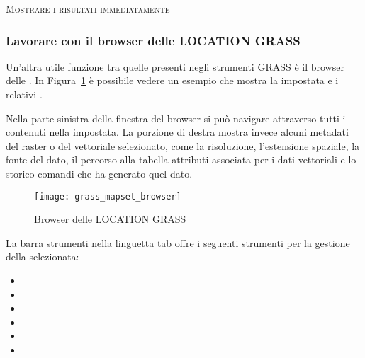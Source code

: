\begin{Tip}\caption{\textsc{Mostrare i risultati immediatamente}}
\end{Tip} 

\subsubsection{Lavorare con il browser delle LOCATION GRASS} 

Un'altra utile funzione tra quelle presenti negli strumenti GRASS è il browser
delle . In Figura~\ref{fig:grass_mapset_browser} è
possibile vedere un esempio che mostra la  impostata 
e i relativi .

Nella parte sinistra della finestra del browser si può navigare attraverso
tutti i  contenuti nella  impostata. La
porzione di destra mostra invece alcuni metadati del raster o del vettoriale
selezionato, come la risoluzione, l'estensione spaziale, la fonte del dato, il
percorso alla tabella attributi associata per i dati vettoriali e lo storico
comandi che ha generato quel dato.

\begin{figure}[h]
 \begin{center}
 \caption{Browser delle LOCATION GRASS \nixcaption}\label{fig:grass_mapset_browser}
 \texttt{[image: grass\_mapset\_browser]}
 \end{center}
\end{figure}

La barra strumenti nella linguetta  tab offre i seguenti
strumenti per la gestione della  selezionata:

\begin{itemize}
\item {}
\item {}
\item {}
\item {}
\item {}
\item {}
\end{itemize}

